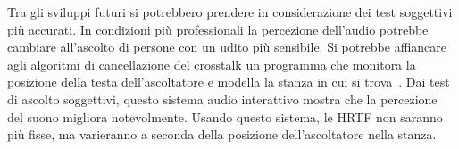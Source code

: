 \documentclass[12pt,a4paper,titlepage]{article}
\begin{document}
Tra gli sviluppi futuri si potrebbero prendere in considerazione dei test soggettivi più accurati. In condizioni più professionali la percezione dell'audio potrebbe cambiare all'ascolto di persone con un udito più sensibile. Si potrebbe affiancare agli algoritmi di cancellazione del crosstalk un programma che monitora la posizione della testa dell'ascoltatore e modella la stanza in cui si trova~\cite{Bai:objective_analysis}. Dai test di ascolto soggettivi, questo sistema audio interattivo mostra che la percezione del suono migliora notevolmente. Usando questo sistema, le HRTF non saranno più fisse, ma varieranno a seconda della posizione dell'ascoltatore nella stanza.





\end{document}
